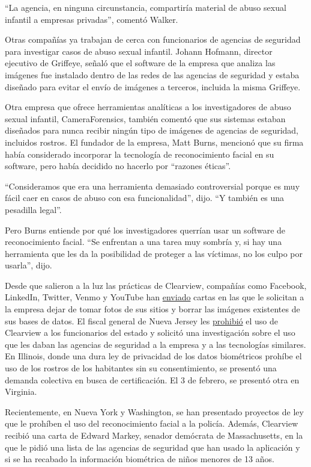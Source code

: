 ``La agencia, en ninguna circunstancia, compartiría material de abuso
sexual infantil a empresas privadas'', comentó Walker.

Otras compañías ya trabajan de cerca con funcionarios de agencias de
seguridad para investigar casos de abuso sexual infantil. Johann
Hofmann, director ejecutivo de Griffeye, señaló que el software de la
empresa que analiza las imágenes fue instalado dentro de las redes de
las agencias de seguridad y estaba diseñado para evitar el envío de
imágenes a terceros, incluida la misma Griffeye.

Otra empresa que ofrece herramientas analíticas a los investigadores de
abuso sexual infantil, CameraForensics, también comentó que sus sistemas
estaban diseñados para nunca recibir ningún tipo de imágenes de agencias
de seguridad, incluidos rostros. El fundador de la empresa, Matt Burns,
mencionó que su firma había considerado incorporar la tecnología de
reconocimiento facial en su software, pero había decidido no hacerlo por
``razones éticas''.

``Consideramos que era una herramienta demasiado controversial porque es
muy fácil caer en casos de abuso con esa funcionalidad'', dijo. ``Y
también es una pesadilla legal''.

Pero Burns entiende por qué los investigadores querrían usar un software
de reconocimiento facial. ``Se enfrentan a una tarea muy sombría y, si
hay una herramienta que les da la posibilidad de proteger a las
víctimas, no los culpo por usarla'', dijo.

Desde que salieron a la luz las prácticas de Clearview, compañías como
Facebook, LinkedIn, Twitter, Venmo y YouTube han
\href{https://www.nytimes.com/2020/01/22/technology/clearview-ai-twitter-letter.html}{enviado}
cartas en las que le solicitan a la empresa dejar de tomar fotos de sus
sitios y borrar las imágenes existentes de sus bases de datos. El fiscal
general de Nueva Jersey les
\href{https://www.nytimes.com/2020/01/24/technology/clearview-ai-new-jersey.html}{prohibió}
el uso de Clearview a los funcionarios del estado y solicitó una
investigación sobre el uso que les daban las agencias de seguridad a la
empresa y a las tecnologías similares. En Illinois, donde una dura ley
de privacidad de los datos biométricos prohíbe el uso de los rostros de
los habitantes sin su consentimiento, se presentó una demanda colectiva
en busca de certificación. El 3 de febrero, se presentó otra en
Virginia.

Recientemente, en Nueva York y Washington, se han presentado proyectos
de ley que le prohíben el uso del reconocimiento facial a la policía.
Además, Clearview recibió una carta de Edward Markey, senador demócrata
de Massachusetts, en la que le pidió una lista de las agencias de
seguridad que han usado la aplicación y si se ha recabado la información
biométrica de niños menores de 13 años.

